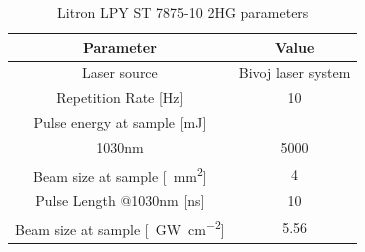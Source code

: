 \begin{table}[h!]
\centering
    \begin{threeparttable}
        \begin{tabular}{||c | c||} 
        \hline
            \textbf{Parameter} & \textbf{Value} \\ [0.5ex] 
        \hline\hline
        Laser source & Bivoj laser system  \\
        \hline
        Repetition Rate [Hz] & 10  \\ 
        \hline
            Pulse energy at sample [mJ] & \\
            1030nm & 5000 \\
        \hline
            Beam size at sample [\SI{}{\mm\squared}] & 4 \\
        \hline
            Pulse Length @1030nm [ns] & 10 \\
        \hline
            Beam size at sample [\SI{}{\giga\watt\per\cm\squared}] & 5.56 \\

        \hline
        \hline
        \end{tabular}

        \caption{Litron LPY ST 7875-10 2HG parameters}
        \label{litronparameters}
    \end{threeparttable}
\end{table}

